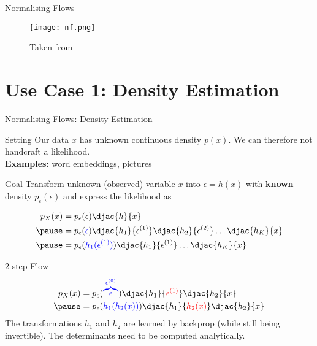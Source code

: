 \documentclass[14pt]{beamer}
\begin{document}
\begin{frame}{Normalising Flows}
\begin{figure}
\texttt{[image: nf.png]}
\caption{Taken from \cite{RezendeMohamed:2015}}
\end{figure}
\end{frame}

\section{Use Case 1: Density Estimation}
\begin{frame}
\tableofcontents[current]
\end{frame}

\begin{frame}{Normalising Flows: Density Estimation}
\begin{block}{Setting}
Our data $ x $ has unknown continuous density $ p(x) $.
We can therefore not handcraft a likelihood.
\\ \pause
\textbf{Examples:} word embeddings, pictures
\end{block}
\pause
\begin{block}{Goal}
Transform unknown (observed)	 variable $ x $ into $ \epsilon = h(x) $ with \textbf{known} density $ p_{\epsilon}(\epsilon) $ and express the likelihood as
\begin{small}
\pause
\begin{equation*}
\begin{aligned}
p_{X}(x) &= p_{\epsilon}(\epsilon)\djac{h}{x} \\ \pause
&= p_{\epsilon}(\textcolor{blue}{\epsilon})\djac{h_{1}}{\epsilon^{(1)}}\djac{h_{2}}{\epsilon^{(2)}}\ldots \djac{h_{K}}{x} \\ \pause
&= p_{\epsilon}(\textcolor{blue}{h_{1}(\epsilon^{(1)})})\djac{h_{1}}{\epsilon^{(1)}}\ldots \djac{h_{K}}{x}
\end{aligned}
\end{equation*}
\end{small}
\end{block}
\end{frame}

\begin{frame}{2-step Flow}
\begin{equation*}
\begin{aligned}
p_{X}(x) &= p_{\epsilon}(\textcolor{blue}{\overbrace{\epsilon}^{\epsilon^{(0)}}})\djac{h_{1}}{\textcolor{red}{\epsilon^{(1)}}}\djac{h_{2}}{x} \\ \pause
&= p_{\epsilon}(\textcolor{blue}{h_{1}(h_{2}(x))})\djac{h_{1}}{\textcolor{red}{h_{2}(x)}}\djac{h_{2}}{x}
\end{aligned}
\end{equation*}
\pause
The transformations $ h_{1} $ and $ h_{2} $ are learned by backprop (while still being invertible). The determinants need to be computed analytically.
\end{frame}
\end{document}
